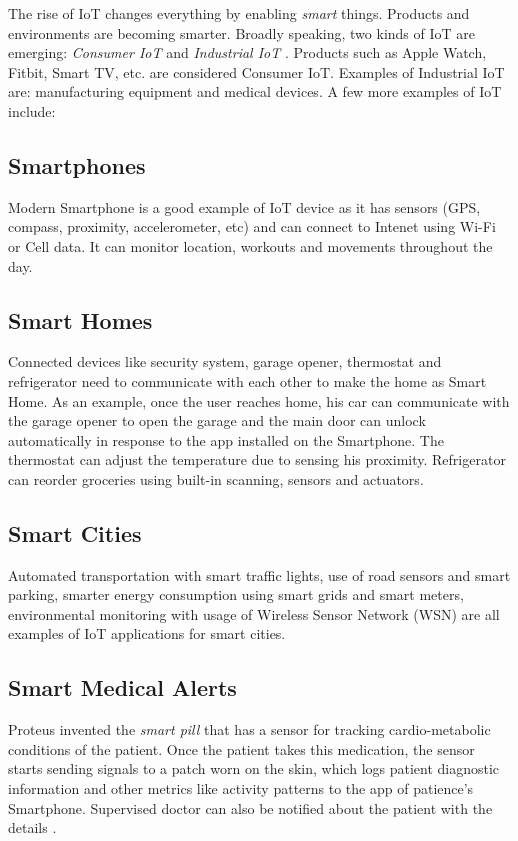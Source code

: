 \documentclass[sigconf]{acmart}
\begin{document}
	The rise of IoT changes everything by enabling {\em smart} things. Products and environments are becoming smarter. Broadly speaking, two kinds of IoT are emerging: {\em Consumer IoT} and {\em Industrial IoT} \cite{iot}. Products such as Apple Watch, Fitbit, Smart TV, etc. are considered Consumer IoT. Examples of Industrial IoT are: manufacturing equipment and medical devices. A few more examples of IoT include:
	
	\subsection{Smartphones}
	Modern Smartphone is a good example of IoT device as it has sensors (GPS, compass, proximity, accelerometer, etc) and can connect to Intenet using Wi-Fi or Cell data. It can monitor location, workouts and movements throughout the day.
	
	\subsection{Smart Homes}
	
	Connected devices like security system, garage opener, thermostat and refrigerator need to communicate with each other to make the home as Smart Home. As an example, once the user reaches home, his car can communicate with the garage opener to open the garage and the main door can unlock automatically in response to the app installed on the Smartphone. The thermostat can adjust the temperature due to sensing his proximity. Refrigerator can reorder groceries using built-in scanning, sensors and actuators. 	
	
	\subsection{Smart Cities}
	
	Automated transportation with smart traffic lights, use of road sensors and smart parking, smarter energy consumption using smart grids and smart meters, environmental monitoring with usage of Wireless Sensor Network (WSN) are all examples of IoT applications for smart cities.
	
	\subsection{Smart Medical Alerts}
	
	Proteus invented the {\em smart pill} that has a sensor for tracking cardio-metabolic conditions of the patient. Once the patient takes this medication, the sensor starts sending signals to a patch worn on the skin, which logs patient diagnostic information and other metrics like activity patterns to the app of patience's Smartphone. Supervised doctor can also be notified about the patient with the details \cite{proteus}.
	
\end{document}
